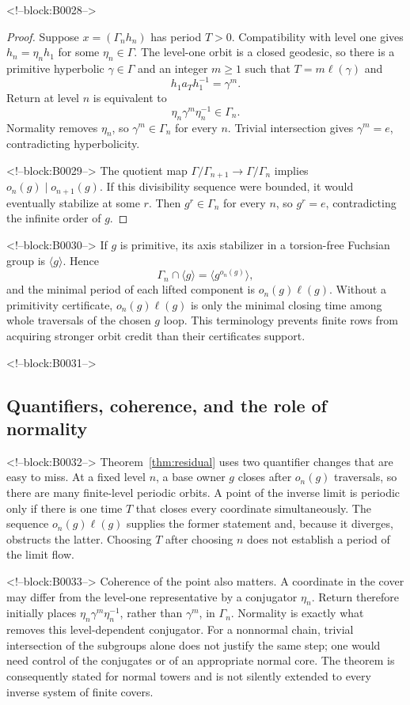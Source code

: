 \documentclass[11pt]{article}
\theoremstyle{definition}
\theoremstyle{remark}
\begin{document}
<!--block:B0028-->
\begin{proof}
Suppose $x=(\Gamma_nh_n)$ has period $T>0$. Compatibility with level one gives $h_n=\eta_nh_1$ for some $\eta_n\in\Gamma$. The level-one orbit is a closed geodesic, so there is a primitive hyperbolic $\gamma\in\Gamma$ and an integer $m\geq1$ such that $T=m\ell(\gamma)$ and
\[
h_1a_Th_1^{-1}=\gamma^m.
\]
Return at level $n$ is equivalent to
\[
\eta_n\gamma^m\eta_n^{-1}\in\Gamma_n.
\]
Normality removes $\eta_n$, so $\gamma^m\in\Gamma_n$ for every $n$. Trivial intersection gives $\gamma^m=e$, contradicting hyperbolicity.

<!--block:B0029-->
The quotient map $\Gamma/\Gamma_{n+1}\to\Gamma/\Gamma_n$ implies $o_n(g)\mid o_{n+1}(g)$. If this divisibility sequence were bounded, it would eventually stabilize at some $r$. Then $g^r\in\Gamma_n$ for every $n$, so $g^r=e$, contradicting the infinite order of $g$.
\end{proof}

<!--block:B0030-->
If $g$ is primitive, its axis stabilizer in a torsion-free Fuchsian group is $\langle g\rangle$. Hence
\[
\Gamma_n\cap\langle g\rangle=\langle g^{o_n(g)}\rangle,
\]
and the minimal period of each lifted component is $o_n(g)\ell(g)$. Without a primitivity certificate, $o_n(g)\ell(g)$ is only the minimal closing time among whole traversals of the chosen $g$ loop. This terminology prevents finite rows from acquiring stronger orbit credit than their certificates support.

<!--block:B0031-->
\subsection{Quantifiers, coherence, and the role of normality}

<!--block:B0032-->
Theorem~\ref{thm:residual} uses two quantifier changes that are easy to miss. At a fixed level $n$, a base owner $g$ closes after $o_n(g)$ traversals, so there are many finite-level periodic orbits. A point of the inverse limit is periodic only if there is one time $T$ that closes every coordinate simultaneously. The sequence $o_n(g)\ell(g)$ supplies the former statement and, because it diverges, obstructs the latter. Choosing $T$ after choosing $n$ does not establish a period of the limit flow.

<!--block:B0033-->
Coherence of the point also matters. A coordinate in the cover may differ from the level-one representative by a conjugator $\eta_n$. Return therefore initially places $\eta_n\gamma^m\eta_n^{-1}$, rather than $\gamma^m$, in $\Gamma_n$. Normality is exactly what removes this level-dependent conjugator. For a nonnormal chain, trivial intersection of the subgroups alone does not justify the same step; one would need control of the conjugates or of an appropriate normal core. The theorem is consequently stated for normal towers and is not silently extended to every inverse system of finite covers.
\end{document}
